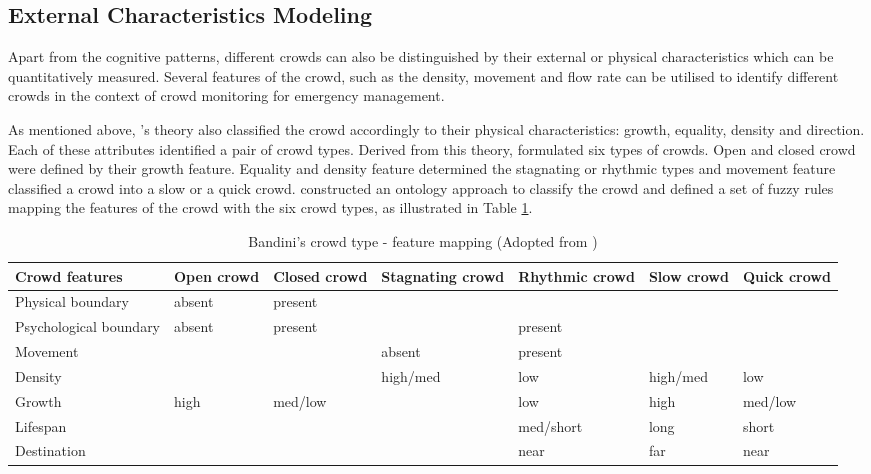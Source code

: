 \subsection{External Characteristics Modeling}

Apart from the cognitive patterns, different crowds can also be distinguished by their external or physical characteristics which can be quantitatively measured. Several features of the crowd, such as the density, movement and flow rate can be utilised to identify different crowds in the context of crowd monitoring for emergency management.

As mentioned above, \textcite{Canetti1962}’s theory also classified the crowd accordingly to their physical characteristics: growth, equality, density and direction. Each of these attributes identified a pair of crowd types. Derived from this theory, \textcite{Bandini2011} formulated six types of crowds. Open and closed crowd were defined by their growth feature. Equality and density feature determined the stagnating or rhythmic types and movement feature classified a crowd into a slow or a quick crowd. \textcite{Bandini2011} constructed an ontology approach to classify the crowd and defined a set of fuzzy rules mapping the features of the crowd with the six crowd types, as illustrated in Table \ref{table:bandiniCrowdType}.

\begin{table}[!htbp]
	\caption{Bandini's crowd type - feature mapping (Adopted from \textcite{Bandini2011})}
	\label{table:bandiniCrowdType}
	\centering
	\begin{tabular}{|p{2.3cm}|p{1.5cm}|p{1.5cm}|p{2cm}|p{2cm}|p{1.5cm}|p{1.4cm}|}
		\hline
		\textbf{Crowd features} & \textbf{Open crowd} & \textbf{Closed crowd} & \textbf{Stagnating crowd} & \textbf{Rhythmic crowd} & \textbf{Slow crowd} & \textbf{Quick crowd} \\ \hline \hline
		Physical boundary & absent & present & & & & \\ \hline
		Psychological boundary & absent & present & & present & & \\ \hline
		Movement & & & absent & present & & \\ \hline
		Density & & & high/med & low & high/med & low \\ \hline
		Growth & high & med/low & & low & high & med/low \\ \hline
		Lifespan & & & & med/short & long & short \\ \hline
		Destination & & & & near & far & near \\ \hline
	\end{tabular}
\end{table}

